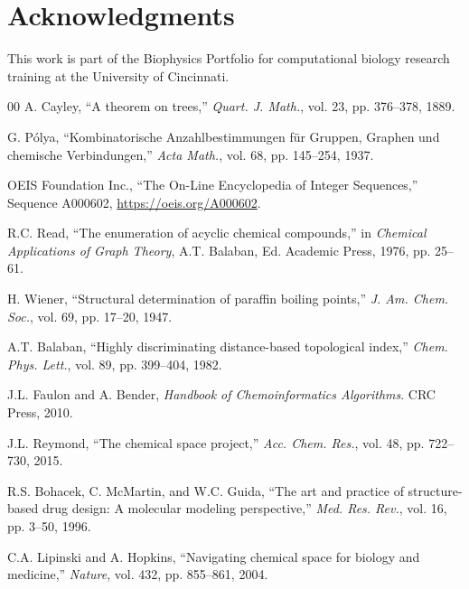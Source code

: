 \documentclass[conference]{IEEEtran}
\begin{document}
\section*{Acknowledgments}

This work is part of the Biophysics Portfolio for computational biology research training at the University of Cincinnati.

\begin{thebibliography}{00}
 A. Cayley, ``A theorem on trees,'' \textit{Quart. J. Math.}, vol. 23, pp. 376--378, 1889.

 G. Pólya, ``Kombinatorische Anzahlbestimmungen für Gruppen, Graphen und chemische Verbindungen,'' \textit{Acta Math.}, vol. 68, pp. 145--254, 1937.

 OEIS Foundation Inc., ``The On-Line Encyclopedia of Integer Sequences,'' Sequence A000602, \url{https://oeis.org/A000602}.

 R.C. Read, ``The enumeration of acyclic chemical compounds,'' in \textit{Chemical Applications of Graph Theory}, A.T. Balaban, Ed. Academic Press, 1976, pp. 25--61.

 H. Wiener, ``Structural determination of paraffin boiling points,'' \textit{J. Am. Chem. Soc.}, vol. 69, pp. 17--20, 1947.

 A.T. Balaban, ``Highly discriminating distance-based topological index,'' \textit{Chem. Phys. Lett.}, vol. 89, pp. 399--404, 1982.

 J.L. Faulon and A. Bender, \textit{Handbook of Chemoinformatics Algorithms}. CRC Press, 2010.

 J.L. Reymond, ``The chemical space project,'' \textit{Acc. Chem. Res.}, vol. 48, pp. 722--730, 2015.

 R.S. Bohacek, C. McMartin, and W.C. Guida, ``The art and practice of structure-based drug design: A molecular modeling perspective,'' \textit{Med. Res. Rev.}, vol. 16, pp. 3--50, 1996.

 C.A. Lipinski and A. Hopkins, ``Navigating chemical space for biology and medicine,'' \textit{Nature}, vol. 432, pp. 855--861, 2004.

\end{thebibliography}
\end{document}
